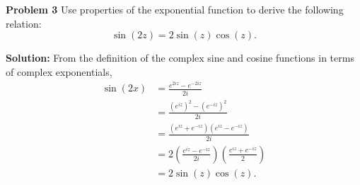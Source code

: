 \documentclass[12pt,oneside]{exam}
\newenvironment{exercise}[1]{\vspace{.1in}\noindent\textbf{Problem #1 \hspace{.05em}}}{}
\begin{document}
\vspace{1cm}

\begin{exercise}{3}
Use properties of the exponential function to derive the following relation:
\begin{equation*}
\sin(2z) = 2\sin(z)\cos(z).
\end{equation*}
\end{exercise}

\vspace{0.5cm}

\noindent \textbf{Solution:} From the definition of the complex sine and cosine functions in terms of complex exponentials, 
\begin{align*}
\sin(2x) & = \frac{e^{2iz}-e^{-2iz}}{2i}\\
& = \frac{(e^{iz})^2-(e^{-iz})^2}{2i}\\
& = \frac{(e^{iz}+e^{-iz})(e^{iz}-e^{-iz})}{2i}\\
& = 2\left(\frac{e^{iz}-e^{-iz}}{2i}\right)\left(\frac{e^{iz}+e^{-iz}}{2}\right)\\
& = 2\sin(z)\cos(z).
\end{align*}
\end{document}
